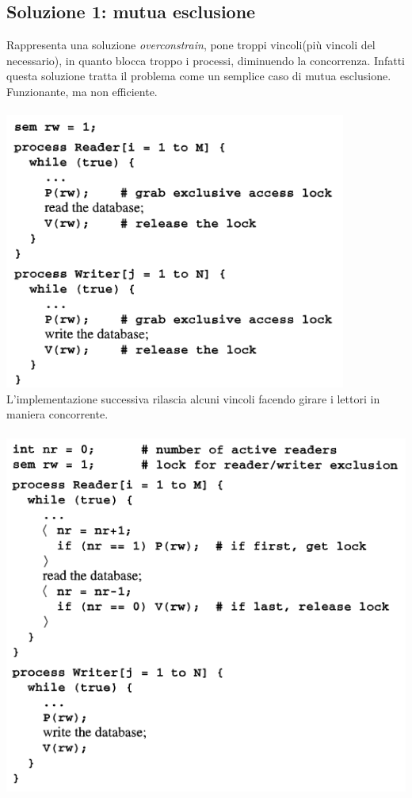 \documentclass[10pt,a4paper]{book}
\begin{document}
\subsection{Soluzione 1: mutua esclusione}
Rappresenta una soluzione \textit{overconstrain}, pone troppi vincoli(più vincoli del necessario), in quanto blocca troppo i processi, diminuendo la concorrenza. Infatti questa soluzione tratta il problema come un semplice caso di mutua esclusione. Funzionante, ma non efficiente. \\ \\
\includegraphics[scale=0.41]{img/over.png} \\
\bigskip 
L'implementazione successiva rilascia alcuni vincoli facendo girare i lettori in maniera concorrente.\\ \\
\includegraphics[scale=0.41]{img/over2.png} \\
\end{document}
